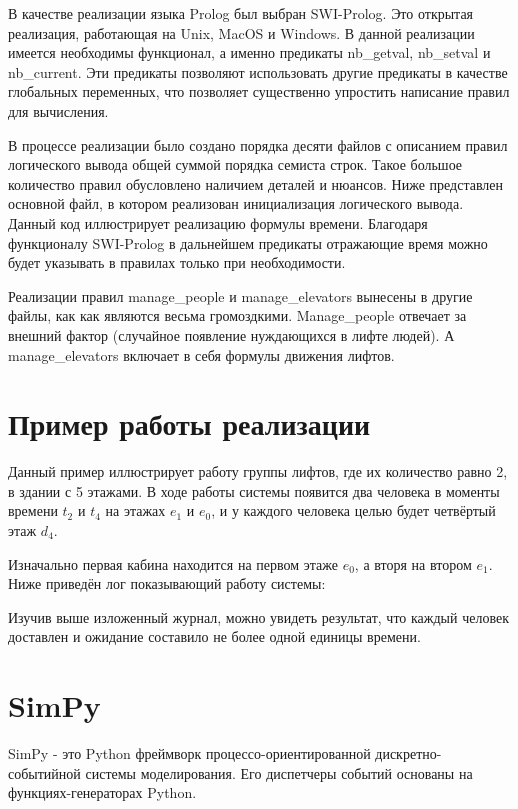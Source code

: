 	В качестве реализации языка Prolog был выбран SWI-Prolog.
		Это открытая реализация, работающая на Unix, MacOS и Windows.
		В данной реализации имеется необходимы функционал, а именно предикаты nb\_getval, nb\_setval и nb\_current.
		Эти предикаты позволяют использовать другие предикаты в качестве глобальных переменных, что
		позволяет существенно упростить написание правил для вычисления.

	В процессе реализации было создано порядка десяти файлов с описанием правил логического вывода
		общей суммой порядка семиста строк. Такое большое количество правил обусловлено наличием деталей и нюансов.
		Ниже представлен основной файл, в котором реализован инициализация логического вывода.
		Данный код иллюстрирует реализацию формулы времени. Благодаря функционалу SWI-Prolog
		в дальнейшем предикаты отражающие время можно будет указывать в правилах только при необходимости.

	Реализации правил manage\_people и manage\_elevators вынесены в другие файлы,
		как как являются весьма громоздкими.
		Manage\_people отвечает за внешний фактор (случайное появление нуждающихся в лифте людей).
		А manage\_elevators включает в себя формулы движения лифтов.

\section{Пример работы реализации}

	Данный пример иллюстрирует работу группы лифтов, где их количество равно 2, в здании с 5 этажами.
		В ходе работы системы появится два человека в моменты времени $t_2$ и $t_4$ на этажах $e_1$ и $e_0$,
		и у каждого человека целью будет четвёртый этаж $d_4$.

	Изначально первая кабина находится на первом этаже $e_0$, а вторя на втором $e_1$.
		Ниже приведён лог показывающий работу системы:

	Изучив выше изложенный журнал, можно увидеть результат, что каждый человек доставлен и ожидание составило не более одной единицы времени.

\section{SimPy}

SimPy - это Python фреймворк процессо-ориентированной дискретно-событийной системы моделирования. Его диспетчеры событий основаны на функциях-генераторах Python.

